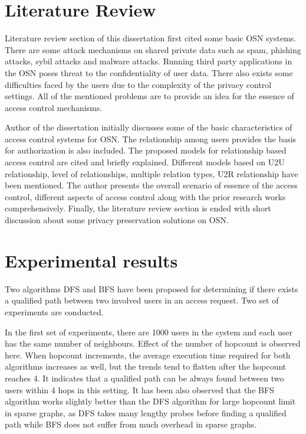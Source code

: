 \documentclass[10pt, conference, compsocconf]{IEEEtran}
\begin{document}
\section{Literature Review}
Literature review section of this dissertation first cited some basic OSN systems. There  are some attack mechanisms on shared private data such as spam, phishing attacks, sybil attacks and malware attacks. Running third party applications in the OSN poses threat to the confidentiality of user data. There also exists some difficulties faced by the users due to the complexity of the privacy control settings. All of the mentioned problems are to provide an idea for the essence of access control mechanisms.

Author of the dissertation initially discusses some of the basic characteristics of access control systems for OSN. The relationship among users provides the basis for authorization is also included. The proposed models for relationship based access control are cited and briefly explained. Different models based on U2U relationship, level of relationships, multiple relation types, U2R relationship have been mentioned. The author presents the overall scenario of essence of the access control, different aspects of access control along with the prior research works comprehensively. Finally, the literature review section is ended with short discussion about some privacy preservation solutions on OSN.

\section{Experimental results}
Two algorithms DFS and BFS have been proposed for determining if there exists a qualified path between two involved users in an access request. Two set of experiments are conducted.

In the first set of experiments, there are 1000 users in the system and each user has the same number of neighbours. Effect of the number of hopcount is observed here. When hopcount increments, the average execution time required for both algorithms increases as well, but the trends tend to flatten after the hopcount reaches 4. It indicates that a qualified path can be always found between two users within 4 hops in this setting. It has been also observed that the BFS algorithm works slightly better than the DFS algorithm for large hopcount
limit in sparse graphs, as DFS takes many lengthy probes before finding a qualified path while BFS
does not suffer from much overhead in sparse graphs.
\end{document}
